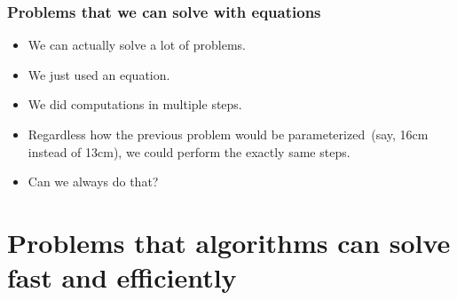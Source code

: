 \documentclass[aspectratio=169,mathserif,notheorems]{beamer}%
\begin{document}
%
\begin{frame}%
\frametitle{Problems that we can solve with equations}%
\begin{itemize}%
\item We can actually solve a lot of problems.%
%
\item<2-> We just used an equation.%
%
\item<3-> We did computations in multiple steps.%
%
\item<4-> Regardless how the previous problem would be parameterized~(say, 16cm instead of 13cm), we could perform the exactly same steps.%
%
\item<5-> \alert{Can we always do that?}%
\end{itemize}%
\end{frame}%
%
%
\section{Problems that algorithms can solve fast and efficiently}%
%
%
%
%
%
%
%
%
\protected\gdef\apath#1#2{{\color{path-#1}{#2}}}%
\protected\gdef\noapath{\protected\gdef\apath##1##2{##2}}%
%
\end{document}
